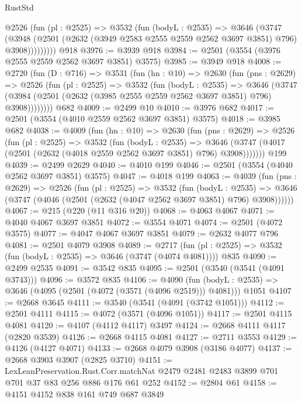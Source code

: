 \begin{lexlean}{RustStd}
\begin{coremodule}
          @2526
            (fun (pl : @2525) =>
            @3532
              (fun (bodyL : @2535) =>
              @3646
                (@3747
                  (@3948
                    (@2501 (@2632 (@3949 @2583 @2555 @2559 @2562 @3697 @3851) @796) @3908)))))))))
    @918
@3976 := @3939 @918
@3984 := @2501 (@3554 (@3976 @2555 @2559 @2562 @3697 @3851) @3575)
@3985 := @3949 @918
@4008 := @2720
    (fun (D : @716) =>
    @3531
      (fun (hn : @10) =>
      @2630
        (fun (pns : @2629) =>
        @2526
          (fun (pl : @2525) =>
          @3532
            (fun (bodyL : @2535) =>
            @3646
              (@3747 (@3984 (@2501 (@2632 (@3985 @2555 @2559 @2562 @3697 @3851) @796) @3908))))))))
    @682
@4009 := @2499 @10
@4010 := @3976 @682
@4017 := @2501 (@3554 (@4010 @2559 @2562 @3697 @3851) @3575)
@4018 := @3985 @682
@4038 := @4009
    (fun (hn : @10) =>
    @2630
      (fun (pns : @2629) =>
      @2526
        (fun (pl : @2525) =>
        @3532
          (fun (bodyL : @2535) =>
          @3646 (@3747 (@4017 (@2501 (@2632 (@4018 @2559 @2562 @3697 @3851) @796) @3908)))))))
    @199
@4039 := @2499 @2629
@4040 := @4010 @199
@4046 := @2501 (@3554 (@4040 @2562 @3697 @3851) @3575)
@4047 := @4018 @199
@4063 := @4039
    (fun (pns : @2629) =>
    @2526
      (fun (pl : @2525) =>
      @3532
        (fun (bodyL : @2535) =>
        @3646 (@3747 (@4046 (@2501 (@2632 (@4047 @2562 @3697 @3851) @796) @3908))))))
@4067 := @215 (@220 (@11 @316 @20))
@4068 := @4063 @4067
@4071 := @4040 @4067 @3697 @3851
@4072 := @3554 @4071
@4074 := @2501 (@4072 @3575)
@4077 := @4047 @4067 @3697 @3851
@4079 := @2632 @4077 @796
@4081 := @2501 @4079 @3908
@4089 := @2717 (fun (pl : @2525) => @3532 (fun (bodyL : @2535) => @3646 (@3747 (@4074 @4081)))) @835
@4090 := @2499 @2535
@4091 := @3542 @835
@4095 := @2501 (@3540 (@3541 (@4091 @3743)))
@4096 := @3572 @835
@4106 := @4090
    (fun (bodyL : @2535) => @3646 (@4095 (@2501 (@4072 (@3571 (@4096 @2519))) @4081)))
    @1051
@4107 := @2668 @3645
@4111 := @3540 (@3541 (@4091 (@3742 @1051)))
@4112 := @2501 @4111
@4115 := @4072 (@3571 (@4096 @1051))
@4117 := @2501 @4115 @4081
@4120 := @4107 (@4112 @4117) @3497
@4124 := @2668 @4111 @4117 (@2820 @3539)
@4126 := @2668 @4115 @4081
@4127 := @2711 @3553
@4129 := @4126 (@4127 @4071)
@4133 := @2668 @4079 @3908 (@3186 @4077)
@4137 := @2668 @3903 @3907 (@2825 @3710)
@4151 := LexLeanPreservation.Rust.Corr.matchNat
    @2479
    @2481
    @2483
    @3899
    @701
    @701
    @37
    @83
    @256
    @886
    @176
    @61
    @252
@4152 := @2804 @61
@4158 := @4151 @4152 @838 @161 @749 @687 @3849

\end{coremodule}
\end{lexlean}
